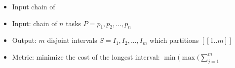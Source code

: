 \documentclass{slides}
\begin{document}
	\begin{itemize}
		\item Input chain of 
    \item Input: chain of $n$ tasks $P = p_1, p_2, ..., p_n$
    \item Output: $m$ disjoint intervals $S = I_1, I_2, ..., I_m$ which
    			partitions $[[1..m]]$
    \item Metric: minimize the cost of the longest interval:
    			$\min(\max(\sum_{j=1}^m$
	\end{itemize}
\end{document}
